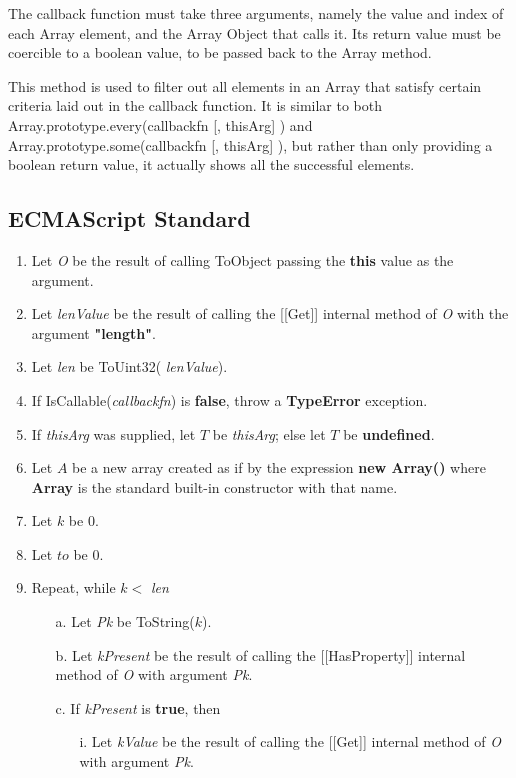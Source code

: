 \documentclass[a4paper,11pt,twoside]{report}
\begin{document}
The callback function must take three arguments, namely the value and index of each Array element, and the Array Object that calls it. Its return value must be coercible to a boolean value, to be passed back to the Array method.

This method is used to filter out all elements in an Array that satisfy certain criteria laid out in the callback function. It is similar to both Array.prototype.every(callbackfn [, thisArg] ) and Array.prototype.some(callbackfn [, thisArg] ), but rather than only providing a boolean return value, it actually shows all the successful elements.

\subsection{ECMAScript Standard}
\begin{enumerate}
\item Let \textit{O} be the result of calling ToObject passing the \textbf{this} value as the argument.
\item Let \textit{lenValue} be the result of calling the [[Get]] internal method of \textit{O} with the argument \textbf{"length"}.
\item Let \textit{len} be ToUint32( \textit{lenValue}).
\item If IsCallable(\textit{callbackfn}) is \textbf{false}, throw a \textbf{TypeError} exception.
\item If \textit{thisArg} was supplied, let $T$ be \textit{thisArg}; else let $T$ be \textbf{undefined}.
\item Let $A$ be a new array created as if by the expression \textbf{new Array()} where \textbf{Array} is the standard built-in constructor with that name.
\item Let $k$ be 0.
\item Let $to$ be 0.
\item Repeat, while $k <$ \textit{len}
\begin{enumerate}
\item[a.] Let \textit{Pk} be ToString($k$).
\item[b.] Let \textit{kPresent} be the result of calling the [[HasProperty]] internal method of \textit{O} with argument \textit{Pk}.
\item[c.] If \textit{kPresent} is \textbf{true}, then
\begin{enumerate}
\item[i.] Let \textit{kValue} be the result of calling the [[Get]] internal method of \textit{O} with argument \textit{Pk}.

\end{enumerate}
\end{enumerate}
\end{enumerate}
\end{document}
